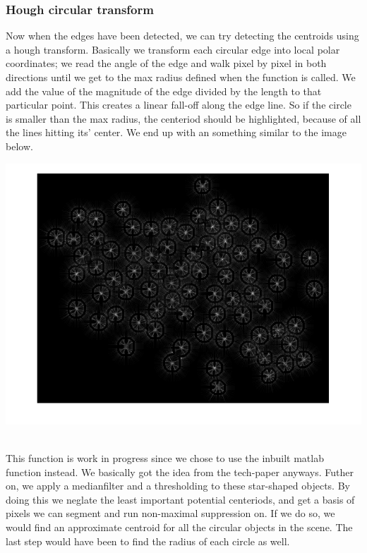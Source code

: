 \subsubsection{Hough circular transform}
Now when the edges have been detected, we can try detecting the centroids using a hough transform. Basically we transform each circular edge into local polar coordinates; we read the angle of the edge and walk pixel by pixel in both directions until we get to the max radius defined when the function is called. We add the value of the magnitude of the edge divided by the length to that particular point. This creates a linear fall-off along the edge line. So if the circle is smaller than the max radius, the centeriod should be highlighted, because of all the lines hitting its' center. We end up with an something  similar to the image below.
\\
\centerline{\includegraphics[scale=0.3]{stars.png}}
\\
This function is work in progress since we chose to use the inbuilt matlab function instead. We basically got the idea from the tech-paper anyways. Futher on, we apply a medianfilter and a thresholding to these star-shaped objects. By doing this we neglate the least important potential centeriods, and get a basis of pixels we can segment and run non-maximal suppression on. If we do so, we would find an approximate centroid for all the circular objects in the scene. The last step would have been to find the radius of each circle as well. 
\\
